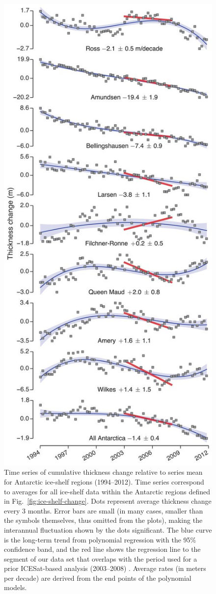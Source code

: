 \begin{figure}[!h]
  \centering
  \includegraphics[width=.53\textwidth]{img/Fig3_ts_regions_review_final.jpg}
  \caption[Time series of cumulative thickness change]{
  \ssp \footnotesize
Time series of cumulative thickness change relative to series mean for Antarctic ice-shelf regions (1994--2012). Time series correspond to averages for all ice-shelf data within the Antarctic regions defined in Fig.~\ref{fig:ice-shelf-change}. Dots represent average thickness change every 3 months. Error bars are small (in many cases, smaller than the symbols themselves, thus omitted from the plots), making the interannual fluctuation shown by the dots significant. The blue curve is the long-term trend from polynomial regression with the 95\% confidence band, and the red line shows the regression line to the segment of our data set that overlaps with the period used for a prior ICESat-based analysis (2003--2008) \parencite{Pritchard2012}. Average rates (in meters per decade) are derived from the end points of the polynomial models.
  \label{fig:ts-regions}
  }
\end{figure}



